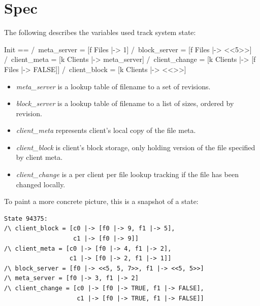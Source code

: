 \section{Spec}

The following describes the variables used track system state:\\
\begin{tla}
Init ==
    /\ meta_server = [f \in Files |-> {1}]                 
    /\ block_server = [f \in Files |-> <<5>>]
    /\ client_meta = [k \in Clients |-> meta_server]
    /\ client_change = [k \in Clients |-> [f \in Files |-> FALSE]]
    /\ client_block = [k \in Clients |-> <<>>]
\end{tla}
\begin{tlatex}
%
\end{tlatex}

\begin{itemize}
    \item \textit{meta\_server} is a lookup table of filename to a set of revisions.
    \item \textit{block\_server} is a lookup table of filename to a list of sizes, ordered by revision.
    \item \textit{client\_meta} represents client's local copy of the file meta.
    \item \textit{client\_block} is client's block storage, only holding version of the file specified by client meta.
    \item \textit{client\_change} is a per client per file lookup tracking if the file has been changed locally.
\end{itemize}

To paint a more concrete picture, this is a snapshot of a state:
\begin{verbatim}
State 94375:
/\ client_block = [c0 |-> [f0 |-> 9, f1 |-> 5], 
                   c1 |-> [f0 |-> 9]]
/\ client_meta = [c0 |-> [f0 |-> 4, f1 |-> 2], 
                  c1 |-> [f0 |-> 2, f1 |-> 1]]
/\ block_server = [f0 |-> <<5, 5, 7>>, f1 |-> <<5, 5>>]
/\ meta_server = [f0 |-> 3, f1 |-> 2]
/\ client_change = [c0 |-> [f0 |-> TRUE, f1 |-> FALSE], 
                    c1 |-> [f0 |-> TRUE, f1 |-> FALSE]]
\end{verbatim}


